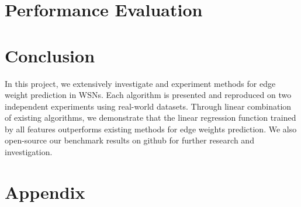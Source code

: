 \documentclass{article}
\begin{document}










\section{Performance Evaluation}




\section{Conclusion}
In this project, we extensively investigate and experiment methods for edge weight prediction in WSNs.
Each algorithm is presented and reproduced on two independent experiments using real-world datasets.
Through linear combination of existing algorithms, we demonstrate that the linear regression function 
trained by all features outperforms existing methods for edge weights prediction. We also open-source 
our benchmark results on github for further research and investigation.






\section*{Appendix}




\end{document}
